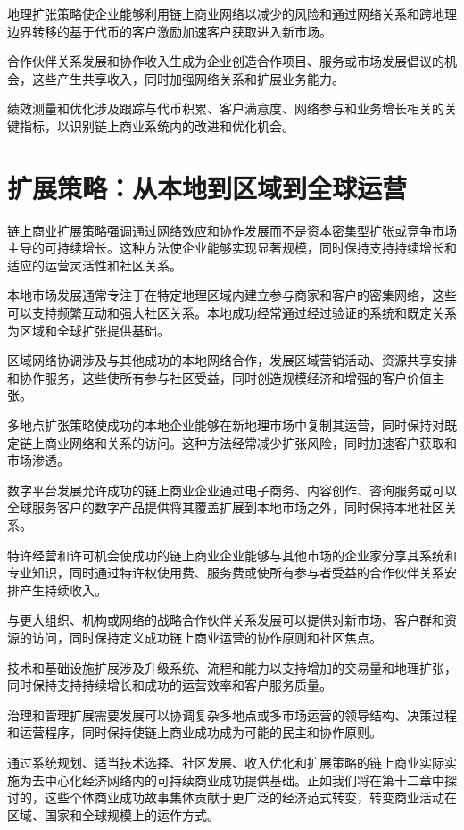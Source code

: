 \documentclass[
  Letterpaper,
]{scrbook}
\begin{document}
地理扩张策略使企业能够利用链上商业网络以减少的风险和通过网络关系和跨地理边界转移的基于代币的客户激励加速客户获取进入新市场。

合作伙伴关系发展和协作收入生成为企业创造合作项目、服务或市场发展倡议的机会，这些产生共享收入，同时加强网络关系和扩展业务能力。

绩效测量和优化涉及跟踪与代币积累、客户满意度、网络参与和业务增长相关的关键指标，以识别链上商业系统内的改进和优化机会。

\section{扩展策略：从本地到区域到全球运营}\label{ux6269ux5c55ux7b56ux7565ux4eceux672cux5730ux5230ux533aux57dfux5230ux5168ux7403ux8fd0ux8425}

链上商业扩展策略强调通过网络效应和协作发展而不是资本密集型扩张或竞争市场主导的可持续增长。这种方法使企业能够实现显著规模，同时保持支持持续增长和适应的运营灵活性和社区关系。

本地市场发展通常专注于在特定地理区域内建立参与商家和客户的密集网络，这些可以支持频繁互动和强大社区关系。本地成功经常通过经过验证的系统和既定关系为区域和全球扩张提供基础。

区域网络协调涉及与其他成功的本地网络合作，发展区域营销活动、资源共享安排和协作服务，这些使所有参与社区受益，同时创造规模经济和增强的客户价值主张。

多地点扩张策略使成功的本地企业能够在新地理市场中复制其运营，同时保持对既定链上商业网络和关系的访问。这种方法经常减少扩张风险，同时加速客户获取和市场渗透。

数字平台发展允许成功的链上商业企业通过电子商务、内容创作、咨询服务或可以全球服务客户的数字产品提供将其覆盖扩展到本地市场之外，同时保持本地社区关系。

特许经营和许可机会使成功的链上商业企业能够与其他市场的企业家分享其系统和专业知识，同时通过特许权使用费、服务费或使所有参与者受益的合作伙伴关系安排产生持续收入。

与更大组织、机构或网络的战略合作伙伴关系发展可以提供对新市场、客户群和资源的访问，同时保持定义成功链上商业运营的协作原则和社区焦点。

技术和基础设施扩展涉及升级系统、流程和能力以支持增加的交易量和地理扩张，同时保持支持持续增长和成功的运营效率和客户服务质量。

治理和管理扩展需要发展可以协调复杂多地点或多市场运营的领导结构、决策过程和运营程序，同时保持使链上商业成功成为可能的民主和协作原则。

通过系统规划、适当技术选择、社区发展、收入优化和扩展策略的链上商业实际实施为去中心化经济网络内的可持续商业成功提供基础。正如我们将在第十二章中探讨的，这些个体商业成功故事集体贡献于更广泛的经济范式转变，转变商业活动在区域、国家和全球规模上的运作方式。
\end{document}
